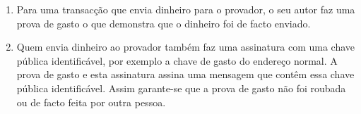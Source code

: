 \begin{enumerate}
    \item Para uma transacção que envia dinheiro para o provador, o seu autor faz uma prova de gasto o que demonstra que o dinheiro foi de facto enviado. 
    \item Quem envia dinheiro ao provador também faz uma assinatura com uma chave pública identificável, por exemplo a chave de gasto do endereço normal. A prova de gasto e esta assinatura assina uma mensagem que contêm essa chave pública identificável. Assim garante-se que a prova de gasto não foi roubada ou de facto feita por outra pessoa.
\end{enumerate}{}
